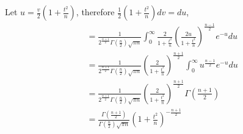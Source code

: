 \documentclass[a4paper]{article}
\begin{document}
Let $u = \frac{v}{2}\left( 1+\frac{t^2}{n} \right) $, therefore $\frac{1}{2}\left( 1+\frac{t^2}{n} \right) dv = du$,
\begin{equation*}
	\begin{split}
				&= \frac{1}{2^{\frac{n+1}{2}}\Gamma\left( \frac{n}{2} \right) \sqrt{\pi n} } \int_{0}^{\infty} \frac{2}{1+\frac{t^2}{n}} \left( \frac{2u}{1+\frac{t^2}{n}} \right) ^{\frac{n-1}{2}} e^{-u} du\\
						&= \frac{1}{2^{\frac{n+1}{2}}\Gamma\left( \frac{n}{2} \right) \sqrt{\pi n} }  \left( \frac{2}{1+\frac{t^2}{n}} \right)^{\frac{n+1}{2}} \int_{0}^{\infty} u^{\frac{n-1}{2}}e^{-u}du\\
&= \frac{1}{2^{\frac{n+1}{2}}\Gamma\left( \frac{n}{2} \right) \sqrt{\pi n} }  \left( \frac{2}{1+\frac{t^2}{n}} \right)^{\frac{n+1}{2}} \Gamma\left( \frac{n+1}{2} \right) \\
&= \frac{\Gamma\left( \frac{n+1}{2} \right) }{\Gamma\left( \frac{n}{2} \right) \sqrt{\pi n} }\left( 1+ \frac{t^2}{n} \right) ^{- \frac{n+1}{2}}
	\end{split}
\end{equation*}

\newpage
\end{document}
